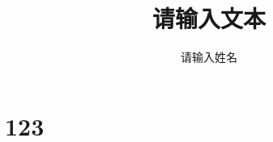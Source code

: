\documentclass{first} %
\title{请输入文本}
\author{请输入姓名}
\begin{document}
    \maketitle
    \section{123}
\end{document}

